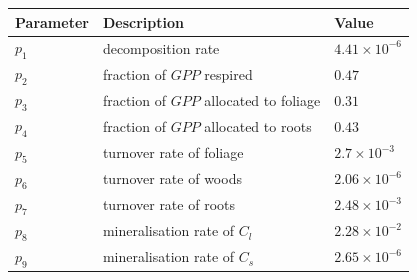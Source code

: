 \documentclass[11pt]{article}
\begin{document}
\begin{center}
\begin{tabular}{| l | l | l |}
\hline
Parameter & Description & Value \\ \hline
$p_1 $ & decomposition rate & $4.41\times 10^{-6}$ \\ \hline
$p_2 $ & fraction of $GPP$ respired & $0.47$ \\ \hline
$p_3 $ & fraction of $GPP$ allocated to foliage & $0.31$ \\ \hline
$p_4 $ & fraction of $GPP$ allocated to roots & $0.43$ \\ \hline
$p_5 $ & turnover rate of foliage & $2.7\times 10^{-3}$ \\ \hline
$p_6 $ & turnover rate of woods & $2.06\times 10^{-6}$ \\ \hline
$p_7 $ & turnover rate of roots & $2.48\times 10^{-3}$ \\ \hline
$p_8 $ & mineralisation rate of $C_l$ & $2.28\times 10^{-2}$ \\ \hline
$p_9 $ & mineralisation rate of $C_s$ & $2.65\times 10^{-6}$ \\ 
\hline
\end{tabular}    
\end{center}
\end{document}
